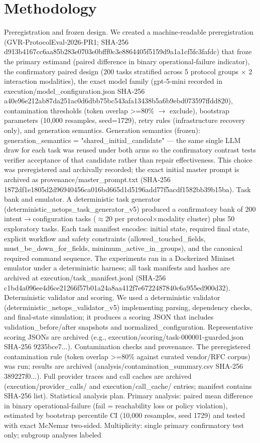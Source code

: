 \documentclass[conference]{IEEEtran}
\begin{document}
\section{Methodology}
Preregistration and frozen design. We created a machine‑readable preregistration (GVR‑ProtocolEval‑2026‑PR1; SHA‑256 d913b4167cc6aa85b283e0703e0bfff0c3e8864405f5159d9a1a1cf5fc3fafdc) that froze the primary estimand (paired difference in binary operational‑failure indicator), the confirmatory paired design (200 tasks stratified across 5 protocol groups \ensuremath{\times} 2 interaction modalities), the exact model family (gpt‑5‑mini recorded in execution/model\_configuration.json SHA‑256 a40e96e212ab87da251ac0d6dbb75bc543afa13438b5a6b9ebd073597ffdd820), contamination thresholds (token overlap >=80\% \ensuremath{\rightarrow} exclude), bootstrap parameters (10,000 resamples, seed=1729), retry rules (infrastructure recovery only), and generation semantics. Generation semantics (frozen): generation\_semantics = "shared\_initial\_candidate" --- the same single LLM draw for each task was reused under both arms so the confirmatory contrast tests verifier acceptance of that candidate rather than repair effectiveness. This choice was preregistered and archivally recorded; the exact initial master prompt is archived as provenance/master\_prompt.txt (SHA‑256 1872df1e1805d2d96940456ca016bd665d1d5196add77f5acdf1582bb39b15ba). Task bank and emulator. A deterministic task generator (deterministic\_netops\_task\_generator\_v5) produced a confirmatory bank of 200 intent\ensuremath{\rightarrow}configuration tasks (\ensuremath{\approx}20 per protocol\ensuremath{\times}modality cluster) plus 50 exploratory tasks. Each task manifest encodes: initial state, required final state, explicit workflow and safety constraints (allowed\_touched\_fields, must\_be\_down\_for\_fields, minimum\_active\_in\_groups), and the canonical required command sequence. The experiments ran in a Dockerized Mininet emulator under a deterministic harness; all task manifests and hashes are archived at execution/task\_manifest.jsonl (SHA‑256 c1bd4a096ee4d6ce21266f57b01a24a8aa412f7e6722487840c6a955ed900d32). Deterministic validator and scoring. We used a deterministic validator (deterministic\_netops\_validator\_v5) implementing parsing, dependency checks, and final‑state simulation; it produces a scoring JSON that includes validation\_before/after snapshots and normalized\_configuration. Representative scoring JSONs are archived (e.g., execution/scoring/task-000001-guarded.json SHA‑256 9235bce7...). Contamination checks and provenance. The preregistered contamination rule (token overlap >=80\% against curated vendor/RFC corpus) was run; results are archived (analysis/contamination\_summary.csv SHA‑256 389227f0...). Full provider traces and call caches are archived (execution/provider\_calls/ and execution/call\_cache/ entries; manifest contains SHA‑256 list). Statistical analysis plan. Primary analysis: paired mean difference in binary operational‑failure (fail = reachability loss or policy violation), estimated by bootstrap percentile CI (10,000 resamples, seed 1729) and tested with exact McNemar two‑sided. Multiplicity: single primary confirmatory test only; subgroup analyses labeled 
\end{document}
